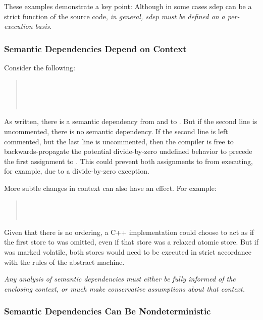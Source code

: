 \documentclass[10]{article}
\begin{document}
These examples demonstrate a key point: Although in some cases sdep can
be a strict function of the source code, \emph{in general, sdep must be
defined on a per-execution basis}.%

\subsubsection{Semantic Dependencies Depend on Context}
\label{sec:Semantic Dependencies Depend on Context}

Consider the following:

\begin{quote}
	 \\
	 \\
	 \\
\end{quote}

As written, there is a semantic dependency from  and 
to .
But if the second line is uncommented, there is no semantic
dependency.
If the second line is left commented, but the last line is uncommented,
then the compiler is free to backwards-propagate the potential
divide-by-zero undefined behavior to precede the first assignment
to .
This could prevent both assignments to  from executing, for example,
due to a divide-by-zero exception.

More subtle changes in context can also have an effect.
For example:

\begin{quote}
	 \\
	 \\
\end{quote}

Given that there is no ordering, a C++ implementation could choose to
act as if the first store to  was omitted, even if that store was
a relaxed atomic store.
But if  was marked volatile, both stores would need to be executed
in strict accordance with the rules of the abstract machine.

\emph{Any analysis of semantic dependencies must either be fully informed
of the enclosing context, or much make conservative assumptions about
that context.}

\subsubsection{Semantic Dependencies Can Be Nondeterministic}
\label{sec:Semantic Dependencies Can Be Nondeterministic}
\end{document}

